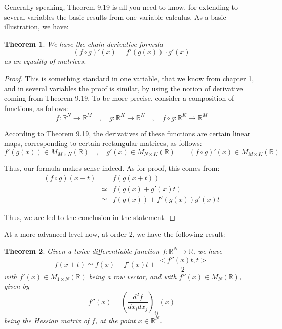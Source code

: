\documentclass[12pt]{amsbook}
\newtheorem{theorem}{Theorem}[chapter]
\begin{document}
Generally speaking, Theorem 9.19 is all you need to know, for extending to several variables the basic results from one-variable calculus. As a basic illustration, we have:


\begin{theorem}
We have the chain derivative formula
$$(f\circ g)'(x)=f'(g(x))\cdot g'(x)$$
as an equality of matrices.
\end{theorem}

\begin{proof}
This is something standard in one variable, that we know from chapter 1, and in several variables the proof is similar, by using the notion of derivative coming from Theorem 9.19. To be more precise, consider a composition of functions, as follows:
$$f:\mathbb R^N\to\mathbb R^M\quad,\quad 
g:\mathbb R^K\to\mathbb R^N\quad,\quad 
f\circ g:\mathbb R^K\to\mathbb R^M$$

According to Theorem 9.19, the derivatives of these functions are certain linear maps, corresponding to certain rectangular matrices, as follows:
$$f'(g(x))\in M_{M\times N}(\mathbb R)\quad,\quad 
g'(x)\in M_{N\times K}(\mathbb R)\quad\quad
(f\circ g)'(x)\in M_{M\times K}(\mathbb R)$$

Thus, our formula makes sense indeed. As for proof, this comes from:
\begin{eqnarray*}
(f\circ g)(x+t)
&=&f(g(x+t))\\
&\simeq&f(g(x)+g'(x)t)\\
&\simeq&f(g(x))+f'(g(x))g'(x)t
\end{eqnarray*}

Thus, we are led to the conclusion in the statement.
\end{proof}

At a more advanced level now, at order 2, we have the following result:


\begin{theorem}
Given a twice differentiable function $f:\mathbb R^N\to\mathbb R$, we have
$$f(x+t)\simeq f(x)+f'(x)t+\frac{<f''(x)t,t>}{2}$$
with $f'(x)\in M_{1\times N}(\mathbb R)$ being a row vector, and with $f''(x)\in M_N(\mathbb R)$, given by 
$$f''(x)=\left(\frac{d^2f}{dx_idx_j}\right)_{ij}(x)$$
being the Hessian matrix of $f$, at the point $x\in\mathbb R^N$.
\end{theorem}
\end{document}
